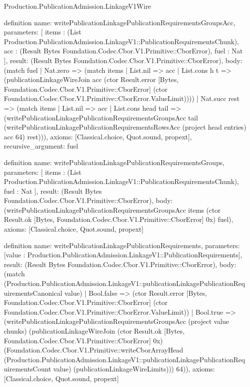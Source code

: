 \begin{lexlean}{Production.PublicationAdmission.LinkageV1Wire}
\begin{semanticmodule}
definition{
  name: writePublicationLinkagePublicationRequirementsGroupsAcc,
  parameters: [
    items : (List Production.PublicationAdmission.LinkageV1::PublicationRequirementsChunk),
    acc : (Result Bytes Foundation.Codec.Cbor.V1.Primitive::CborError),
    fuel : Nat
  ],
  result: (Result Bytes Foundation.Codec.Cbor.V1.Primitive::CborError),
  body: (match fuel
    | Nat.zero => (match items
      | List.nil => acc
      | List.cons h t => (publicationLinkageWireJoin acc (ctor Result.error [Bytes, Foundation.Codec.Cbor.V1.Primitive::CborError] (ctor Foundation.Codec.Cbor.V1.Primitive::CborError.ValueLimit))))
    | Nat.succ rest => (match items
      | List.nil => acc
      | List.cons head tail => (writePublicationLinkagePublicationRequirementsGroupsAcc tail (writePublicationLinkagePublicationRequirementsRowsAcc (project head entries) acc 64) rest))),
  axioms: [Classical.choice, Quot.sound, propext],
  recursive_argument: fuel
}

definition{
  name: writePublicationLinkagePublicationRequirementsGroups,
  parameters: [
    items : (List Production.PublicationAdmission.LinkageV1::PublicationRequirementsChunk),
    fuel : Nat
  ],
  result: (Result Bytes Foundation.Codec.Cbor.V1.Primitive::CborError),
  body: (writePublicationLinkagePublicationRequirementsGroupsAcc items (ctor Result.ok [Bytes, Foundation.Codec.Cbor.V1.Primitive::CborError] 0x) fuel),
  axioms: [Classical.choice, Quot.sound, propext]
}

definition{
  name: writePublicationLinkagePublicationRequirements,
  parameters: [value : Production.PublicationAdmission.LinkageV1::PublicationRequirements],
  result: (Result Bytes Foundation.Codec.Cbor.V1.Primitive::CborError),
  body: (match (Production.PublicationAdmission.LinkageV1::publicationLinkagePublicationRequirementsCanonical value)
    | Bool.false => (ctor Result.error [Bytes, Foundation.Codec.Cbor.V1.Primitive::CborError] (ctor Foundation.Codec.Cbor.V1.Primitive::CborError.ValueLimit))
    | Bool.true => (writePublicationLinkagePublicationRequirementsGroupsAcc (project value chunks) (publicationLinkageWireJoin (ctor Result.ok [Bytes, Foundation.Codec.Cbor.V1.Primitive::CborError] 0x) (Foundation.Codec.Cbor.V1.Primitive::writeCborArrayHead (Production.PublicationAdmission.LinkageV1::publicationLinkagePublicationRequirementsCount value) (publicationLinkageWireLimits))) 64)),
  axioms: [Classical.choice, Quot.sound, propext]
}


\end{semanticmodule}
\end{lexlean}
